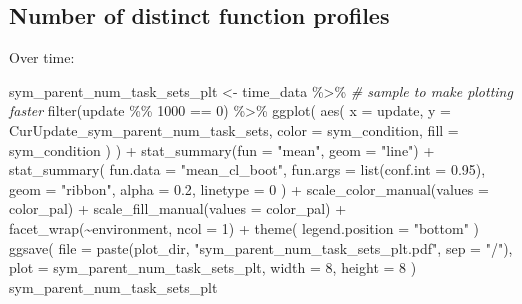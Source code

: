 \documentclass[
]{book}
\newenvironment{Shaded}{\begin{snugshade}}{\end{snugshade}}
\newcommand{\AttributeTok}[1]{\textcolor[rgb]{0.77,0.63,0.00}{#1}}
\newcommand{\CommentTok}[1]{\textcolor[rgb]{0.56,0.35,0.01}{\textit{#1}}}
\newcommand{\DecValTok}[1]{\textcolor[rgb]{0.00,0.00,0.81}{#1}}
\newcommand{\FloatTok}[1]{\textcolor[rgb]{0.00,0.00,0.81}{#1}}
\newcommand{\FunctionTok}[1]{\textcolor[rgb]{0.00,0.00,0.00}{#1}}
\newcommand{\NormalTok}[1]{#1}
\newcommand{\OtherTok}[1]{\textcolor[rgb]{0.56,0.35,0.01}{#1}}
\newcommand{\SpecialCharTok}[1]{\textcolor[rgb]{0.00,0.00,0.00}{#1}}
\newcommand{\StringTok}[1]{\textcolor[rgb]{0.31,0.60,0.02}{#1}}
\begin{document}
\hypertarget{number-of-distinct-function-profiles-5}{%
\subsection{Number of distinct function profiles}\label{number-of-distinct-function-profiles-5}}

Over time:

\begin{Shaded}
\begin{Highlighting}[]
\NormalTok{sym\_parent\_num\_task\_sets\_plt }\OtherTok{\textless{}{-}}\NormalTok{ time\_data }\SpecialCharTok{\%\textgreater{}\%}
  \CommentTok{\# sample to make plotting faster}
  \FunctionTok{filter}\NormalTok{(update }\SpecialCharTok{\%\%} \DecValTok{1000} \SpecialCharTok{==} \DecValTok{0}\NormalTok{) }\SpecialCharTok{\%\textgreater{}\%}
  \FunctionTok{ggplot}\NormalTok{(}
    \FunctionTok{aes}\NormalTok{(}
      \AttributeTok{x =}\NormalTok{ update,}
      \AttributeTok{y =}\NormalTok{ CurUpdate\_sym\_parent\_num\_task\_sets,}
      \AttributeTok{color =}\NormalTok{ sym\_condition,}
      \AttributeTok{fill =}\NormalTok{ sym\_condition}
\NormalTok{    )}
\NormalTok{  ) }\SpecialCharTok{+}
  \FunctionTok{stat\_summary}\NormalTok{(}\AttributeTok{fun =} \StringTok{"mean"}\NormalTok{, }\AttributeTok{geom =} \StringTok{"line"}\NormalTok{) }\SpecialCharTok{+}
  \FunctionTok{stat\_summary}\NormalTok{(}
    \AttributeTok{fun.data =} \StringTok{"mean\_cl\_boot"}\NormalTok{,}
    \AttributeTok{fun.args =} \FunctionTok{list}\NormalTok{(}\AttributeTok{conf.int =} \FloatTok{0.95}\NormalTok{),}
    \AttributeTok{geom =} \StringTok{"ribbon"}\NormalTok{,}
    \AttributeTok{alpha =} \FloatTok{0.2}\NormalTok{,}
    \AttributeTok{linetype =} \DecValTok{0}
\NormalTok{  ) }\SpecialCharTok{+}
  \FunctionTok{scale\_color\_manual}\NormalTok{(}\AttributeTok{values =}\NormalTok{ color\_pal) }\SpecialCharTok{+}
  \FunctionTok{scale\_fill\_manual}\NormalTok{(}\AttributeTok{values =}\NormalTok{ color\_pal) }\SpecialCharTok{+}
  \FunctionTok{facet\_wrap}\NormalTok{(}\SpecialCharTok{\textasciitilde{}}\NormalTok{environment, }\AttributeTok{ncol =} \DecValTok{1}\NormalTok{) }\SpecialCharTok{+}
  \FunctionTok{theme}\NormalTok{(}
    \AttributeTok{legend.position =} \StringTok{"bottom"}
\NormalTok{  )}
\FunctionTok{ggsave}\NormalTok{(}
  \AttributeTok{file =} \FunctionTok{paste}\NormalTok{(plot\_dir, }\StringTok{"sym\_parent\_num\_task\_sets\_plt.pdf"}\NormalTok{, }\AttributeTok{sep =} \StringTok{"/"}\NormalTok{),}
  \AttributeTok{plot =}\NormalTok{ sym\_parent\_num\_task\_sets\_plt,}
  \AttributeTok{width =} \DecValTok{8}\NormalTok{,}
  \AttributeTok{height =} \DecValTok{8}
\NormalTok{)}
\NormalTok{sym\_parent\_num\_task\_sets\_plt}
\end{Highlighting}
\end{Shaded}
\end{document}
